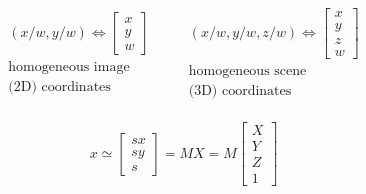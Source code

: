 \begin{align}
	\begin{matrix}
        (x/w,y/w) \Leftrightarrow \begin{bmatrix} x \\ y \\ w \end{bmatrix} \\ 
        \textrm{homogeneous image} \\ 
        \textrm{(2D) coordinates}
    \end{matrix} 
    \nonumber \quad \quad
    \begin{matrix}
        (x/w,y/w,z/w) \Leftrightarrow \begin{bmatrix} x \\ y \\ z \\ w \end{bmatrix} \\ 
        \textrm{homogeneous scene} \\ 
        \textrm{(3D) coordinates }
    \end{matrix} \nonumber
\end{align}

\begin{gather}
	x \simeq \begin{bmatrix} sx \\ sy \\ s \end{bmatrix} = MX = M \begin{bmatrix} X \\ Y \\ Z  \\ 1 \end{bmatrix} \label{eq:world-to-image-trans}
\end{gather}

